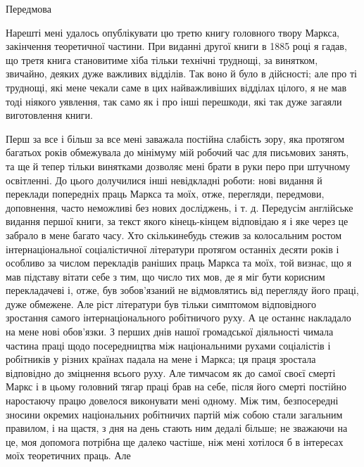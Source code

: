 Передмова

Нарешті мені удалось опублікувати цю третю книгу головного
твору Маркса, закінчення теоретичної частини. При виданні
другої книги в 1885 році я гадав, що третя книга становитиме
хіба тільки технічні труднощі, за винятком, звичайно, деяких
дуже важливих відділів. Так воно й було в дійсності; але про ті
труднощі, які мене чекали саме в цих найважливіших відділах
цілого, я не мав тоді ніякого уявлення, так само як і про інші
перешкоди, які так дуже загаяли виготовлення книги.

Перш за все і більш за все мені заважала постійна слабість
зору, яка протягом багатьох років обмежувала до мінімуму мій
робочий час для письмових занять, та ще й тепер тільки винятками
дозволяє мені брати в руки перо при штучному освітленні.
До цього долучилися інші невідкладні роботи: нові видання й
переклади попередніх праць Маркса та моїх, отже, перегляди,
передмови, доповнення, часто неможливі без нових досліджень,
і т. д. Передусім англійське видання першої книги, за текст
якого кінець-кінцем відповідаю я і яке через це забрало в мене
багато часу. Хто скількинебудь стежив за колосальним ростом
інтернаціональної соціалістичної літератури протягом останніх
десяти років і особливо за числом перекладів раніших праць
Маркса та моїх, той визнає, що я мав підставу вітати себе
з тим, що число тих мов, де я міг бути корисним перекладачеві
і, отже, був зобов’язаний не відмовлятись від перегляду його
праці, дуже обмежене. Але ріст літератури був тільки симптомом
відповідного зростання самого інтернаціонального робітничого
руху. А це останнє накладало на мене нові обов’язки.
З перших днів нашої громадської діяльності чимала частина праці
щодо посередництва між національними рухами соціалістів і робітників
у різних країнах падала на мене і Маркса; ця праця зростала
відповідно до зміцнення всього руху. Але тимчасом як
до самої своєї смерті Маркс і в цьому головний тягар праці
брав на себе, після його смерті постійно наростаючу працю довелося
виконувати мені одному. Між тим, безпосередні зносини
окремих національних робітничих партій між собою стали загальним
правилом, і на щастя, з дня на день стають ним дедалі більше;
не зважаючи на це, моя допомога потрібна ще далеко частіше,
ніж мені хотілося б в інтересах моїх теоретичних праць. Але
\parbreak{}  %
